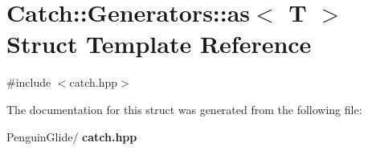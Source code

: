 \section{Catch\+::Generators\+::as$<$ T $>$ Struct Template Reference}
\label{struct_catch_1_1_generators_1_1as}


{\ttfamily \#include $<$catch.\+hpp$>$}



The documentation for this struct was generated from the following file\+:\begin{DoxyCompactItemize}
\item 
Penguin\+Glide/\textbf{ catch.\+hpp}\end{DoxyCompactItemize}
